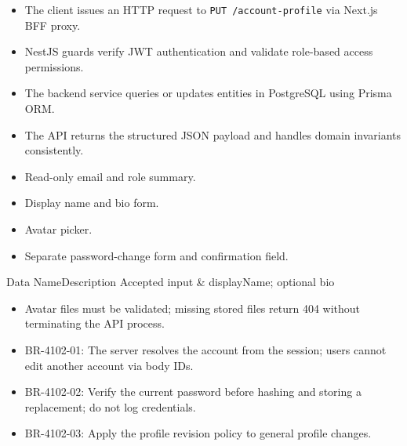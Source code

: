 \begin{itemize}[leftmargin=1.6em,topsep=3pt,itemsep=2pt,parsep=0pt,label=$\bullet$]
    \item The client issues an HTTP request to \texttt{PUT /\allowbreak{}account-\allowbreak{}profile} via Next.js BFF proxy.
    \item NestJS guards verify JWT authentication and validate role-based access permissions.
    \item The backend service queries or updates entities in PostgreSQL using Prisma ORM.
    \item The API returns the structured JSON payload and handles domain invariants consistently.
\end{itemize}

\begin{itemize}[leftmargin=1.6em,topsep=3pt,itemsep=2pt,parsep=0pt,label=$\bullet$]
    \item Read-only email and role summary.
    \item Display name and bio form.
    \item Avatar picker.
    \item Separate password-change form and confirmation field.
\end{itemize}


\begin{specdatatable}{Data Name}{Description}
Accepted input & displayName; optional bio\\ \hline
\end{specdatatable}

\begin{itemize}[leftmargin=1.6em,topsep=3pt,itemsep=2pt,parsep=0pt,label=$\bullet$]
    \item Avatar files must be validated; missing stored files return 404 without terminating the API process.
\end{itemize}

\begin{itemize}[leftmargin=1.6em,topsep=3pt,itemsep=2pt,parsep=0pt,label=$\bullet$]\brrulelist
    \item BR-4102-01: The server resolves the account from the session; users cannot edit another account via body IDs.
    \item BR-4102-02: Verify the current password before hashing and storing a replacement; do not log credentials.
    \item BR-4102-03: Apply the profile revision policy to general profile changes.
\end{itemize}

